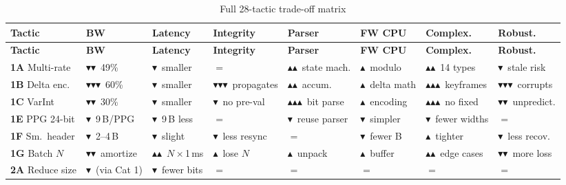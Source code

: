 \documentclass[11pt,a4paper]{article}
\newcommand{\tactic}[1]{\textbf{#1}}
\newcommand{\metricdown}{$\blacktriangledown$}
\newcommand{\metricup}{$\blacktriangle$}
\newcommand{\metriceq}{$=$}
\begin{document}
{
\setlength{\tabcolsep}{3pt}
\tiny
\begin{longtable}{|l|C{1.5cm}|C{1.3cm}|C{1.3cm}|C{1.3cm}|C{1.3cm}|C{1.7cm}|C{1.5cm}|}
\caption{Full 28-tactic trade-off matrix} \label{tab:full-matrix} \\
\hline
\textbf{Tactic} & \textbf{BW} & \textbf{Latency} & \textbf{Integrity} & \textbf{Parser} & \textbf{FW CPU} & \textbf{Complex.} & \textbf{Robust.} \\\hline
\endfirsthead
\hline
\textbf{Tactic} & \textbf{BW} & \textbf{Latency} & \textbf{Integrity} & \textbf{Parser} & \textbf{FW CPU} & \textbf{Complex.} & \textbf{Robust.} \\\hline
\endhead
\hline
\endfoot

\tactic{1A} Multi-rate &
\metricdown\metricdown\ 49\% &
\metricdown\ smaller &
\metriceq &
\metricup\metricup\ state mach. &
\metricup\ modulo &
\metricup\metricup\ 14 types &
\metricdown\ stale risk \\

\tactic{1B} Delta enc. &
\metricdown\metricdown\metricdown\ 60\% &
\metricdown\ smaller &
\metricdown\metricdown\metricdown\ propagates &
\metricup\metricup\ accum. &
\metricup\ delta math &
\metricup\metricup\metricup\ keyframes &
\metricdown\metricdown\metricdown\ corrupts \\

\tactic{1C} VarInt &
\metricdown\metricdown\ 30\% &
\metricdown\ smaller &
\metricdown\ no pre-val &
\metricup\metricup\metricup\ bit parse &
\metricup\ encoding &
\metricup\metricup\metricup\ no fixed &
\metricdown\metricdown\ unpredict. \\

\tactic{1E} PPG 24-bit &
\metricdown\ 9\,B/PPG &
\metricdown\ 9\,B less &
\metriceq &
\metricdown\ reuse parser &
\metricdown\ simpler &
\metricdown\ fewer widths &
\metriceq \\

\tactic{1F} Sm.\ header &
\metricdown\ 2--4\,B &
\metricdown\ slight &
\metricdown\ less resync &
\metriceq &
\metricdown\ fewer B &
\metricup\ tighter &
\metricdown\ less recov. \\

\tactic{1G} Batch $N$ &
\metricdown\metricdown\ amortize &
\metricup\metricup\ $N\times$1\,ms &
\metricup\ lose $N$ &
\metricup\ unpack &
\metricup\ buffer &
\metricup\metricup\ edge cases &
\metricdown\metricdown\ more loss \\

\tactic{2A} Reduce size &
\metricdown\ (via Cat 1) &
\metricdown\ fewer bits &
\metriceq &
\metriceq &
\metriceq &
\metriceq &
\metriceq \\


\end{longtable}}
\end{document}
